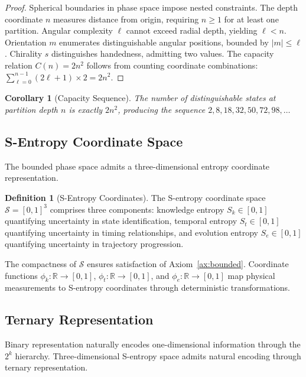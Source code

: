 \documentclass[12pt,a4paper]{article}
\theoremstyle{plain}
\newtheorem{corollary}[theorem]{Corollary}
\theoremstyle{definition}
\newtheorem{definition}[theorem]{Definition}
\theoremstyle{remark}
\newcommand{\Sspace}{\mathcal{S}}
\newcommand{\Sk}{S_k}
\newcommand{\St}{S_t}
\newcommand{\Se}{S_e}
\newcommand{\RR}{\mathbb{R}}
\begin{document}
\begin{proof}
Spherical boundaries in phase space impose nested constraints. The depth coordinate $n$ measures distance from origin, requiring $n \geq 1$ for at least one partition. Angular complexity $\ell$ cannot exceed radial depth, yielding $\ell < n$. Orientation $m$ enumerates distinguishable angular positions, bounded by $|m| \leq \ell$. Chirality $s$ distinguishes handedness, admitting two values. The capacity relation $C(n) = 2n^2$ follows from counting coordinate combinations: $\sum_{\ell=0}^{n-1} (2\ell+1) \times 2 = 2n^2$.
\end{proof}

\begin{corollary}[Capacity Sequence]
The number of distinguishable states at partition depth $n$ is exactly $2n^2$, producing the sequence $2, 8, 18, 32, 50, 72, 98, \ldots$
\end{corollary}

\subsection{S-Entropy Coordinate Space}

The bounded phase space admits a three-dimensional entropy coordinate representation.

\begin{definition}[S-Entropy Coordinates]
\label{def:s_entropy}
The S-entropy coordinate space $\Sspace = [0,1]^3$ comprises three components: knowledge entropy $\Sk \in [0,1]$ quantifying uncertainty in state identification, temporal entropy $\St \in [0,1]$ quantifying uncertainty in timing relationships, and evolution entropy $\Se \in [0,1]$ quantifying uncertainty in trajectory progression.
\end{definition}

The compactness of $\Sspace$ ensures satisfaction of Axiom~\ref{ax:bounded}. Coordinate functions $\phi_k: \RR \to [0,1]$, $\phi_t: \RR \to [0,1]$, and $\phi_e: \RR \to [0,1]$ map physical measurements to S-entropy coordinates through deterministic transformations.

\subsection{Ternary Representation}

Binary representation naturally encodes one-dimensional information through the $2^k$ hierarchy. Three-dimensional S-entropy space admits natural encoding through ternary representation.
\end{document}
